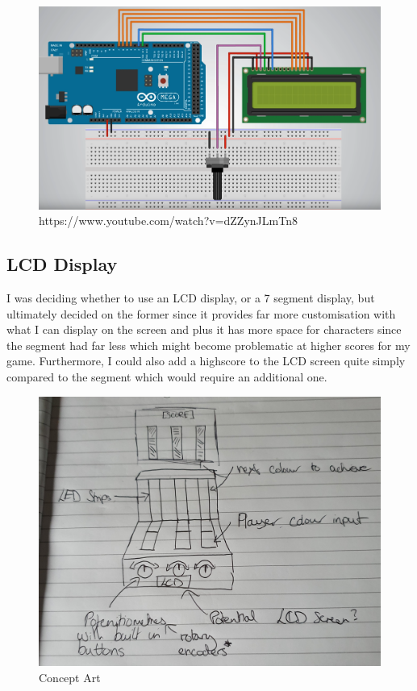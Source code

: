 \documentclass{article}
\begin{document}
\begin{figure}[ht]
  \includegraphics[width=\textwidth,height=\textheight,keepaspectratio]{lcd_display.PNG}
  \caption{https://www.youtube.com/watch?v=dZZynJLmTn8}
  \label{fig:lcd_display}
\end{figure}

\subsection{LCD Display}

I was deciding whether to use an LCD display, or a 7 segment display, but ultimately decided on the former since it provides far more customisation with what I can display on the screen and plus it has more space for characters since the segment had far less which might become problematic at higher scores for my game. Furthermore, I could also add a highscore to the LCD screen quite simply compared to the segment which would require an additional one.

\begin{figure}[ht]
  \includegraphics[width=\textwidth,height=\textheight,keepaspectratio]{controller_concept.jpg}
  \caption{Concept Art}
  \label{fig:concept}
\end{figure}
\end{document}
